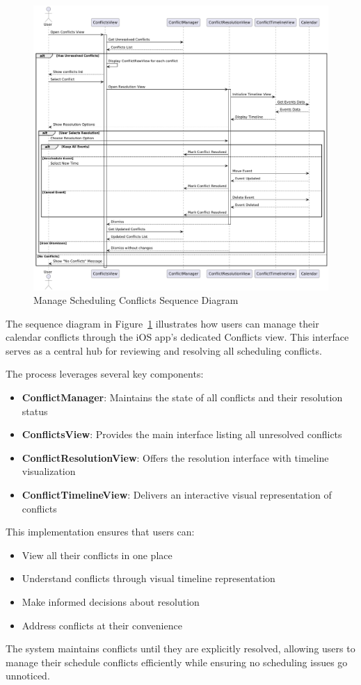 \begin{figure}[!h]
  \centering
  \includegraphics[width=\textwidth]{images/docs/diagrams/sequence-diagrams/all-sequence-diagrams/Manage Scheduling Conflicts.png}
  \caption{Manage Scheduling Conflicts Sequence Diagram}
  \label{fig:seq/manage-scheduling-conflicts}
\end{figure}

The sequence diagram in Figure~\ref{fig:seq/manage-scheduling-conflicts} illustrates how users can manage their calendar conflicts through the iOS app's dedicated Conflicts view. This interface serves as a central hub for reviewing and resolving all scheduling conflicts.

The process leverages several key components:
\begin{itemize}
  \item \textbf{ConflictManager}: Maintains the state of all conflicts and their resolution status
  \item \textbf{ConflictsView}: Provides the main interface listing all unresolved conflicts
  \item \textbf{ConflictResolutionView}: Offers the resolution interface with timeline visualization
  \item \textbf{ConflictTimelineView}: Delivers an interactive visual representation of conflicts
\end{itemize}

This implementation ensures that users can:
\begin{itemize}
  \item View all their conflicts in one place
  \item Understand conflicts through visual timeline representation
  \item Make informed decisions about resolution
  \item Address conflicts at their convenience
\end{itemize}

The system maintains conflicts until they are explicitly resolved, allowing users to manage their schedule conflicts efficiently while ensuring no scheduling issues go unnoticed.
